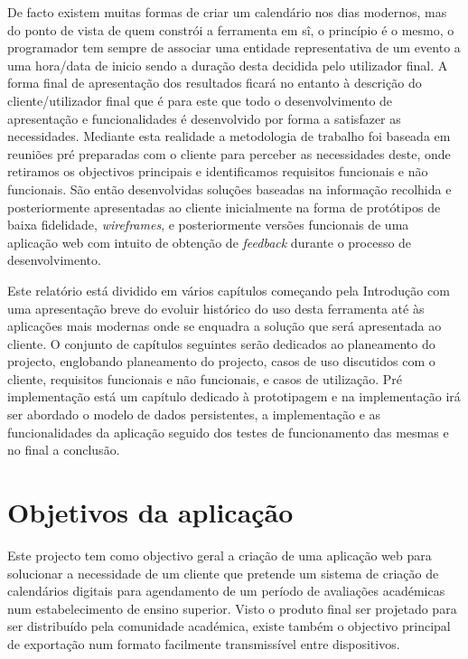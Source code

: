 \documentclass[11pt, twoside]{report}
\begin{document}
	De facto existem muitas formas de criar um calendário nos dias modernos, mas do ponto de vista de quem constrói a ferramenta em sî, o princípio é o mesmo, o programador tem sempre de associar uma entidade representativa de um evento a uma hora/data de inicio sendo a duração desta decidida pelo utilizador final. 
	A forma final de apresentação dos resultados ficará no entanto à descrição do cliente/utilizador final que é para este que todo o desenvolvimento de apresentação e funcionalidades é desenvolvido por forma a satisfazer as necessidades.
	Mediante esta realidade a metodologia de trabalho foi baseada em reuniões pré preparadas com o cliente para perceber as necessidades deste, onde retiramos os objectivos principais e identificamos requisitos funcionais e não funcionais.
	São então desenvolvidas soluções baseadas na informação recolhida e posteriormente apresentadas ao cliente inicialmente na forma de protótipos de baixa fidelidade, \textit{wireframes}, e posteriormente versões funcionais de uma aplicação web com intuito de obtenção de \textit{feedback} durante o processo de desenvolvimento.
	
	Este relatório está dividido em vários capítulos começando pela Introdução com uma apresentação breve do evoluir histórico do uso desta ferramenta até às aplicações mais modernas onde se enquadra a solução que será apresentada ao cliente.
	O conjunto de capítulos seguintes serão dedicados ao planeamento do projecto, englobando planeamento do projecto, casos de uso discutidos com o cliente, requisitos funcionais e não funcionais, e casos de utilização.
	Pré implementação está um capítulo dedicado à prototipagem e na implementação irá ser abordado  o modelo de dados persistentes, a implementação e as funcionalidades da aplicação seguido dos testes de funcionamento das mesmas e no final a conclusão.
	
	\section{Objetivos da aplicação}
	
	Este projecto tem como objectivo geral a criação de uma aplicação web para solucionar a necessidade de um cliente que pretende um sistema de criação de calendários digitais para agendamento de um período de avaliações académicas num estabelecimento de ensino superior. 
	Visto o produto final ser projetado para ser distribuído pela comunidade académica, existe também o objectivo principal de exportação num formato facilmente transmissível entre dispositivos.  
	
\end{document}
